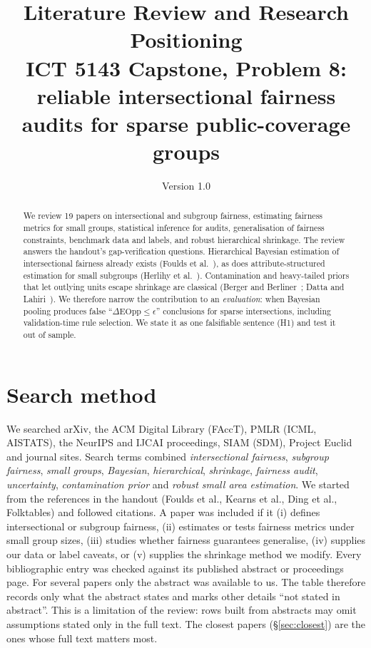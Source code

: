 \documentclass[10pt]{article}
\title{Literature Review and Research Positioning\\[2pt]\large ICT 5143 Capstone, Problem 8: reliable intersectional fairness audits for sparse public-coverage groups}
\author{\Authors}
\date{Version 1.0 \textperiodcentered{} \nbDate}
\begin{document}
\maketitle

\begin{abstract}
We review 19 papers on intersectional and subgroup fairness, estimating fairness metrics for small groups, statistical
inference for audits, generalisation of fairness constraints, benchmark data and labels, and robust hierarchical shrinkage.
The review answers the handout's gap-verification questions. Hierarchical Bayesian estimation of intersectional fairness
already exists (Foulds et al.~\cite{foulds2020bayes}), as does attribute-structured estimation for small subgroups
(Herlihy et al.~\cite{herlihy2024}). Contamination and heavy-tailed priors that let outlying units escape shrinkage are
classical (Berger and Berliner~\cite{berger1986}; Datta and Lahiri~\cite{datta1995}). We therefore narrow the
contribution to an \emph{evaluation}: when Bayesian pooling produces false ``$\Delta\text{EOpp}\le\epsilon$'' conclusions
for sparse intersections, including validation-time rule selection. We state it as one falsifiable sentence (H1) and
test it out of sample.
\end{abstract}

\section{Search method}
We searched arXiv, the ACM Digital Library (FAccT), PMLR (ICML, AISTATS), the NeurIPS and IJCAI proceedings, SIAM (SDM),
Project Euclid and journal sites. Search terms combined \emph{intersectional fairness}, \emph{subgroup fairness},
\emph{small groups}, \emph{Bayesian}, \emph{hierarchical}, \emph{shrinkage}, \emph{fairness audit},
\emph{uncertainty}, \emph{contamination prior} and \emph{robust small area estimation}. We started from the references
in the handout (Foulds et al., Kearns et al., Ding et al., Folktables) and followed citations. A paper was included if it
(i) defines intersectional or subgroup fairness, (ii) estimates or tests fairness metrics under small group sizes,
(iii) studies whether fairness guarantees generalise, (iv) supplies our data or label caveats, or (v) supplies the
shrinkage method we modify. Every bibliographic entry was checked against its published abstract or proceedings page.
For several papers only the abstract was available to us. The table therefore records only what the abstract states and
marks other details ``not stated in abstract''. This is a limitation of the review: rows built from abstracts may omit assumptions stated only in the
full text. The closest papers (\S\ref{sec:closest}) are the ones whose full text matters most.
\end{document}
